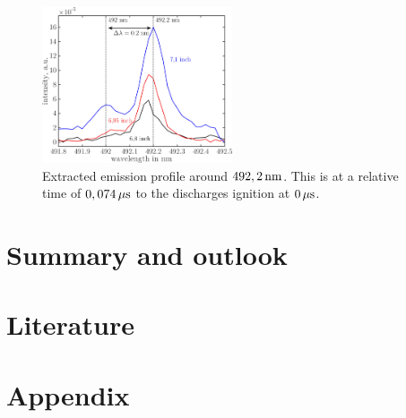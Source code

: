 \documentclass[a4paper,10pt,twoside]{article}
\begin{document}
				\begin{figure}
					\centering
					\includegraphics[width=0.5\textwidth]{figures/stark/combinations/stark_shiftallheights.pdf}
					\caption{Extracted emission profile around $\unit[492,2]{nm}$. This is at a relative time of $\unit[0,074]{\mu s}$ to the discharges ignition at $\unit[0]{\mu s}$.}
					\label{img:starkshift71}
				\end{figure}

	\section{Summary and outlook}
		
	\clearpage
		
	\section{Literature}

		
		
		
	\section{Appendix}
\end{document}
